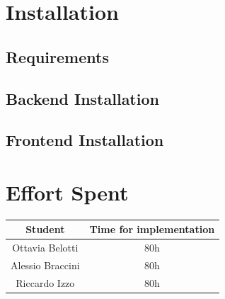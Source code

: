 \documentclass[table, 12pt]{article}
\begin{document}


\section{Installation}
\subsection{Requirements}
\subsection{Backend Installation}
\subsection{Frontend Installation}

\section{Effort Spent}
\begin{tabular}{|c||c|}
    \hline
    Student & Time for implementation\\ \hline
    Ottavia Belotti & 80h\\
    Alessio Braccini & 80h\\
    Riccardo Izzo & 80h\\
    \hline
\end{tabular}
\end{document}

